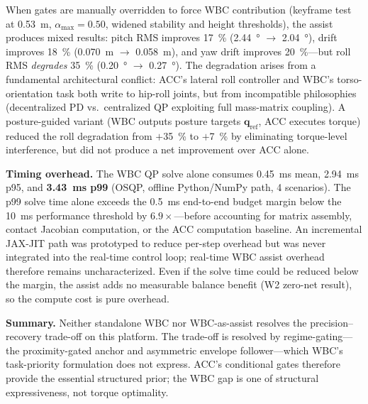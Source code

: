 When gates are manually overridden to force WBC contribution (keyframe test at \SI{0.53}{m}, $\alpha_{\max}{=}0.50$, widened stability and height thresholds), the assist produces mixed results:
pitch RMS improves \SI{17}{\percent} (\SI{2.44}{\degree} $\rightarrow$ \SI{2.04}{\degree}), drift improves \SI{18}{\percent} (\SI{0.070}{m} $\rightarrow$ \SI{0.058}{m}), and yaw drift improves \SI{20}{\percent}---but roll RMS \emph{degrades} \SI{35}{\percent} (\SI{0.20}{\degree} $\rightarrow$ \SI{0.27}{\degree}).
The degradation arises from a fundamental architectural conflict:
ACC's lateral roll controller and WBC's torso-orientation task both write to hip-roll joints, but from incompatible philosophies (decentralized PD vs.\ centralized QP exploiting full mass-matrix coupling).
A posture-guided variant (WBC outputs posture targets $\mathbf{q}_{\text{ref}}$, ACC executes torque) reduced the roll degradation from $+$\SI{35}{\percent} to $+$\SI{7}{\percent} by eliminating torque-level interference, but did not produce a net improvement over ACC alone.

\medskip\noindent\textbf{Timing overhead.}
The WBC QP solve alone consumes \SI{0.45}{ms} mean, \SI{2.94}{ms} p95, and \textbf{\SI{3.43}{ms} p99} (OSQP, offline Python/NumPy path, 4 scenarios).
The p99 solve time alone exceeds the \SI{0.5}{ms} end-to-end budget margin below the \SI{10}{ms} performance threshold by $\num{6.9}\times$---before accounting for matrix assembly, contact Jacobian computation, or the ACC computation baseline.
An incremental JAX-JIT path was prototyped to reduce per-step overhead but was never integrated into the real-time control loop; real-time WBC assist overhead therefore remains uncharacterized.
Even if the solve time could be reduced below the margin, the assist adds no measurable balance benefit (W2 zero-net result), so the compute cost is pure overhead.

\medskip\noindent\textbf{Summary.}
Neither standalone WBC nor WBC-as-assist resolves the precision--recovery trade-off on this platform.
The trade-off is resolved by regime-gating---the proximity-gated anchor and asymmetric envelope follower---which WBC's task-priority formulation does not express.
ACC's conditional gates therefore provide the essential structured prior; the WBC gap is one of structural expressiveness, not torque optimality.



